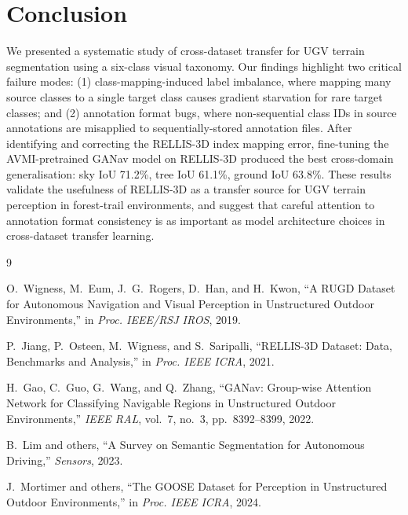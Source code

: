 \documentclass[conference]{IEEEtran}
\begin{document}
\section{Conclusion}

We presented a systematic study of cross-dataset transfer for UGV terrain segmentation using a six-class visual taxonomy. Our findings highlight two critical failure modes: (1) class-mapping-induced label imbalance, where mapping many source classes to a single target class causes gradient starvation for rare target classes; and (2) annotation format bugs, where non-sequential class IDs in source annotations are misapplied to sequentially-stored annotation files. After identifying and correcting the RELLIS-3D index mapping error, fine-tuning the AVMI-pretrained GANav model on RELLIS-3D produced the best cross-domain generalisation: sky IoU 71.2\%, tree IoU 61.1\%, ground IoU 63.8\%. These results validate the usefulness of RELLIS-3D as a transfer source for UGV terrain perception in forest-trail environments, and suggest that careful attention to annotation format consistency is as important as model architecture choices in cross-dataset transfer learning.

\begin{thebibliography}{9}

O.~Wigness, M.~Eum, J.~G.~Rogers, D.~Han, and H.~Kwon,
``A RUGD Dataset for Autonomous Navigation and Visual Perception in Unstructured Outdoor Environments,''
in \textit{Proc. IEEE/RSJ IROS}, 2019.

P.~Jiang, P.~Osteen, M.~Wigness, and S.~Saripalli,
``RELLIS-3D Dataset: Data, Benchmarks and Analysis,''
in \textit{Proc. IEEE ICRA}, 2021.

H.~Gao, C.~Guo, G.~Wang, and Q.~Zhang,
``GANav: Group-wise Attention Network for Classifying Navigable Regions in Unstructured Outdoor Environments,''
\textit{IEEE RAL}, vol.~7, no.~3, pp.~8392--8399, 2022.

B.~Lim and others,
``A Survey on Semantic Segmentation for Autonomous Driving,''
\textit{Sensors}, 2023.

J.~Mortimer and others,
``The GOOSE Dataset for Perception in Unstructured Outdoor Environments,''
in \textit{Proc. IEEE ICRA}, 2024.

\end{thebibliography}
\end{document}

